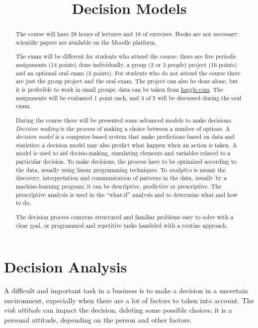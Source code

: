\documentclass[11pt, twocolumn]{article}
\title{\textbf{Decision Models}}
\author{}
\date{}
\begin{document}
\maketitle
\begin{abstract}
  The course will have 28 hours of lectures and 18 of exercises.
  Books are not necessary: scientific papers are available on the Moodle platform.

  The exam will be different for students who attend the course: there are five periodic assignments (14 points) done individually, a group (2 or 3 people) project (16 points) and an optional oral exam (3 points).
  For students who do not attend the course there are just the group project and the oral exam.
  The project can also be done alone, but it is preferible to work in small groups; data can be taken from \url{kaggle.com}.
  The assignments will be evaluated 1 point each, and 3 of 5 will be discussed during the oral exam. \newline

  During the course there will be presented some advanced models to make decisions.
  \textit{Decision making} is the process of making a choice between a number of options.
  A \textit{decision model} is a computer-based system that make predictions based on data and statistics; a decision model may also predict what happen when an action is taken.
  A model is used to aid decisio-making, simulating elements and variables related to a particular decision.
  To make decisions, the process have to be optimized according to the data, usually using linear programming techniques.
  To \textit{analytics} is meant the discovery, interpretation and communication of patterns in the data, usually by a machine-learning program; it can be descriptive, predictive or prescriptive.
  The prescriptive analysis is used in the ``what-if'' analysis and to determine what and how to do.

  The decision process concerns structured and familiar problems easy to solve with a clear goal, or programmed and repetitive tasks handeled with a routine approach.
\end{abstract}


\newpage
\tableofcontents


\newpage
\part{Decision Analysis}
A difficult and important task in a business is to make a decision in a uncertain environment, expecially when there are a lot of factors to taken into account.
The \textit{risk attitude} can impact the decision, deleting some possible choices; it is a personal attitude, depending on the person and other factors.
\end{document}
